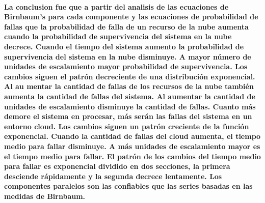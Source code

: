 \paragraph{
    La conclusion fue que a partir del analisis de las ecuaciones de Birnbaum’s para cada componente y las ecuaciones de probabilidad de fallas que la probabilidad de falla de un recurso de la nube aumenta cuando la probabilidad de supervivencia del sistema en la nube decrece. Cuando el tiempo del sistema aumento la probabilidad de supervivencia del sistema en la nube disminuye. A mayor número de unidades de escalamiento mayor probabilidad de supervivencia. Los cambios siguen el patrón decreciente de una  distribución exponencial. Al au mentar la cantidad de fallas de los recursos de la nube también aumenta la cantidad de fallas del sistema. Al aumentar la cantidad de unidades de escalamiento disminuye la cantidad de fallas. Cuanto más demore el sistema en procesar, más serán las fallas del sistema en un entorno cloud. Los cambios siguen un patrón creciente de la función exponencial. Cuando la cantidad de fallas del cloud aumenta, el tiempo medio para fallar disminuye. A más unidades de escalamiento mayor es el tiempo medio para fallar. El patrón de los cambios del tiempo medio para fallar es exponencial dividido en dos secciones, la primera desciende rápidamente y la segunda decrece lentamente. Los componentes paralelos son las confiables que las series basadas en las medidas de Birnbaum.
}

